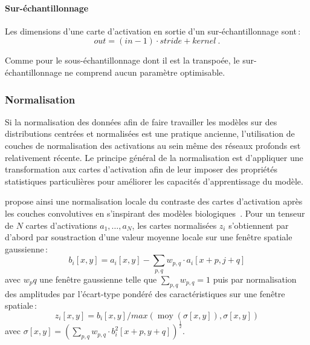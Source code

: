 \paragraph{Sur-échantillonnage}
Les dimensions d'une carte d'activation en sortie d'un sur-échantillonnage sont\,:
$$out = (in - 1) \cdot stride + kernel~.$$

Comme pour le sous-échantillonnage dont il est la transpoée, le sur-échantillonnage ne comprend aucun paramètre optimisable.

\subsubsection{Normalisation}

Si la normalisation des données afin de faire travailler les modèles sur des distributions centrées et normalisées est une pratique ancienne, l'utilisation de couches de normalisation des activations au sein même des réseaux profonds est relativement récente. Le principe général de la normalisation est d'appliquer une transformation aux cartes d'activation afin de leur imposer des propriétés statistiques particulières pour améliorer les capacités d'apprentissage du modèle.

\citet{jarrett_what_2009} propose ainsi une normalisation locale du contraste des cartes d'activation après les couches convolutives en s'inspirant des modèles biologiques~\cite{pinto_why_2008}. Pour un tenseur de $N$ cartes d'activations $a_1,\dots,a_N$, les cartes normalisées $z_i$ s'obtiennent par d'abord par soustraction d'une valeur moyenne locale sur une fenêtre spatiale gaussienne\,:
$$b_i[x,y] = a_i[x,y] - \sum_{p,q} w_{p,q} \cdot a_i[x+p,j+q]$$ avec $w_pq$ une fenêtre gaussienne telle que $\sum_{p,q} w_{p,q} = 1$
puis par normalisation des amplitudes par l'écart-type pondéré des caractéristiques sur une fenêtre spatiale\,:
$$z_i[x,y] = b_i[x,y] / max(\operatorname{moy}(\sigma[x,y]), \sigma[x,y])$$ avec $\sigma[x,y] = \left(\sum_{p,q} w_{p,q} \cdot b_i^2[x+p,y+q] \right)^{\frac{1}{2}}$.

